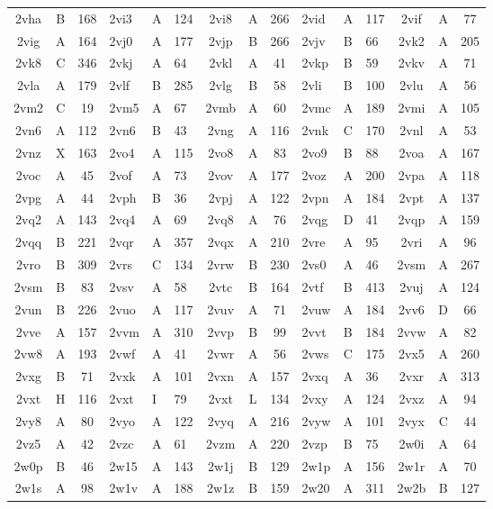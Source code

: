 \begin{longtable}{|c|c|c| a|a|a| c|c|c| a|a|a| c|c|c|}
2vha & B & 168 & 2vi3 & A & 124 & 2vi8 & A & 266 & 2vid & A & 117 & 2vif & A & 77\\
2vig & A & 164 & 2vj0 & A & 177 & 2vjp & B & 266 & 2vjv & B & 66 & 2vk2 & A & 205\\
2vk8 & C & 346 & 2vkj & A & 64 & 2vkl & A & 41 & 2vkp & B & 59 & 2vkv & A & 71\\
2vla & A & 179 & 2vlf & B & 285 & 2vlg & B & 58 & 2vli & B & 100 & 2vlu & A & 56\\
2vm2 & C & 19 & 2vm5 & A & 67 & 2vmb & A & 60 & 2vmc & A & 189 & 2vmi & A & 105\\
2vn6 & A & 112 & 2vn6 & B & 43 & 2vng & A & 116 & 2vnk & C & 170 & 2vnl & A & 53\\
2vnz & X & 163 & 2vo4 & A & 115 & 2vo8 & A & 83 & 2vo9 & B & 88 & 2voa & A & 167\\
2voc & A & 45 & 2vof & A & 73 & 2vov & A & 177 & 2voz & A & 200 & 2vpa & A & 118\\
2vpg & A & 44 & 2vph & B & 36 & 2vpj & A & 122 & 2vpn & A & 184 & 2vpt & A & 137\\
2vq2 & A & 143 & 2vq4 & A & 69 & 2vq8 & A & 76 & 2vqg & D & 41 & 2vqp & A & 159\\
2vqq & B & 221 & 2vqr & A & 357 & 2vqx & A & 210 & 2vre & A & 95 & 2vri & A & 96\\
2vro & B & 309 & 2vrs & C & 134 & 2vrw & B & 230 & 2vs0 & A & 46 & 2vsm & A & 267\\
2vsm & B & 83 & 2vsv & A & 58 & 2vtc & B & 164 & 2vtf & B & 413 & 2vuj & A & 124\\
2vun & B & 226 & 2vuo & A & 117 & 2vuv & A & 71 & 2vuw & A & 184 & 2vv6 & D & 66\\
2vve & A & 157 & 2vvm & A & 310 & 2vvp & B & 99 & 2vvt & B & 184 & 2vvw & A & 82\\
2vw8 & A & 193 & 2vwf & A & 41 & 2vwr & A & 56 & 2vws & C & 175 & 2vx5 & A & 260\\
2vxg & B & 71 & 2vxk & A & 101 & 2vxn & A & 157 & 2vxq & A & 36 & 2vxr & A & 313\\
2vxt & H & 116 & 2vxt & I & 79 & 2vxt & L & 134 & 2vxy & A & 124 & 2vxz & A & 94\\
2vy8 & A & 80 & 2vyo & A & 122 & 2vyq & A & 216 & 2vyw & A & 101 & 2vyx & C & 44\\
2vz5 & A & 42 & 2vzc & A & 61 & 2vzm & A & 220 & 2vzp & B & 75 & 2w0i & A & 64\\
2w0p & B & 46 & 2w15 & A & 143 & 2w1j & B & 129 & 2w1p & A & 156 & 2w1r & A & 70\\
2w1s & A & 98 & 2w1v & A & 188 & 2w1z & B & 159 & 2w20 & A & 311 & 2w2b & B & 127\\

\end{longtable}
